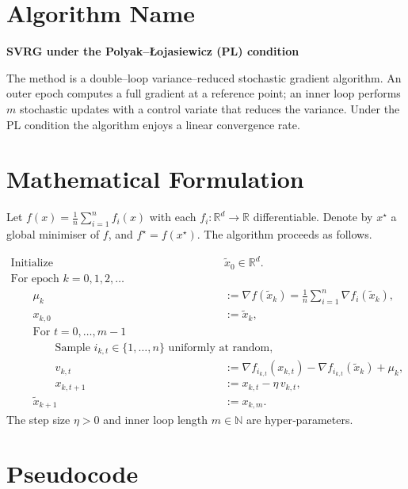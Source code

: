 \documentclass{article}
\newcommand{\R}{\mathbb{R}}
\begin{document}
\section*{Algorithm Name}
\textbf{SVRG under the Polyak–\L{}ojasiewicz (PL) condition}  

The method is a double–loop variance–reduced stochastic gradient algorithm.  
An outer epoch computes a full gradient at a reference point; an inner loop
performs $m$ stochastic updates with a control variate that reduces the
variance.  Under the PL condition the algorithm enjoys a linear convergence
rate.

\section*{Mathematical Formulation}
Let $f(x)=\frac{1}{n}\sum_{i=1}^{n} f_i(x)$ with each $f_i:\R^d\to\R$ differentiable.
Denote by $x^{\star}$ a global minimiser of $f$, and $f^{\star}=f(x^{\star})$.
The algorithm proceeds as follows.

\begin{align}
\text{Initialize }&\tilde x_0\in\R^d . \nonumber\\[4pt]
\text{For epoch }k=0,1,2,\dots&\nonumber\\
\qquad\mu_k &:= \nabla f(\tilde x_k)=\frac{1}{n}\sum_{i=1}^{n}\nabla f_i(\tilde x_k) ,\tag{1}\\
\qquad x_{k,0}&:=\tilde x_k ,\tag{2}\\
\qquad\text{For }t=0,\dots,m-1&\nonumber\\
\qquad\qquad\text{Sample }i_{k,t}\in\{1,\dots,n\}\text{ uniformly at random,}\nonumber\\
\qquad\qquad v_{k,t}&:=\nabla f_{i_{k,t}}(x_{k,t})-\nabla f_{i_{k,t}}(\tilde x_k)+\mu_k ,\tag{3}\\
\qquad\qquad x_{k,t+1}&:=x_{k,t}-\eta\, v_{k,t},\tag{4}\\
\qquad\tilde x_{k+1}&:=x_{k,m}. \tag{5}
\end{align}
The step size $\eta>0$ and inner loop length $m\in\mathbb N$ are hyper‑parameters.

\section*{Pseudocode}
\begin{algorithm}[H]
\caption{SVRG under PL}
\label{alg:svrg-pl}
\end{algorithm}
\end{document}
